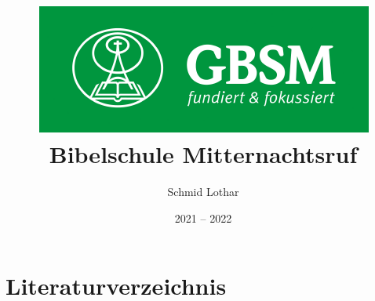 \documentclass{inc/bible_class}
\author{Schmid Lothar}
\date{2021 -- 2022}
\title{
    \includegraphics[scale=1]{Daten/images/GBSM.png}\\
    \textbf{Bibelschule Mitternachtsruf}
}
\begin{document}
\maketitle
\tableofcontents

\newpage




\chapter{Literaturverzeichnis}

\end{document}
